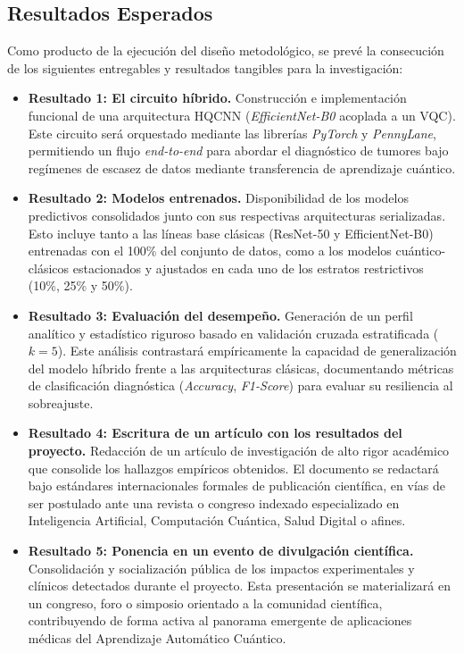 \documentclass[12pt,letterpaper]{article}
\begin{document}
    \subsection{Resultados Esperados}
    \vspace{-0.5cm}

    Como producto de la ejecución del diseño metodológico, se prevé la consecución de los siguientes entregables y resultados tangibles para la investigación:

    \begin{itemize}
        \item \textbf{Resultado 1: El circuito híbrido.} Construcción e implementación funcional de una arquitectura HQCNN (\textit{EfficientNet-B0} acoplada a un VQC). Este circuito será orquestado mediante las librerías \textit{PyTorch} y \textit{PennyLane}, permitiendo un flujo \textit{end-to-end} para abordar el diagnóstico de tumores bajo regímenes de escasez de datos mediante transferencia de aprendizaje cuántico.
        
        \item \textbf{Resultado 2: Modelos entrenados.} Disponibilidad de los modelos predictivos consolidados junto con sus respectivas arquitecturas serializadas. Esto incluye tanto a las líneas base clásicas (ResNet-50 y EfficientNet-B0) entrenadas con el 100\% del conjunto de datos, como a los modelos cuántico-clásicos estacionados y ajustados en cada uno de los estratos restrictivos (10\%, 25\% y 50\%).
        
        \item \textbf{Resultado 3: Evaluación del desempeño.} Generación de un perfil analítico y estadístico riguroso basado en validación cruzada estratificada ($k=5$). Este análisis contrastará empíricamente la capacidad de generalización del modelo híbrido frente a las arquitecturas clásicas, documentando métricas de clasificación diagnóstica (\textit{Accuracy}, \textit{F1-Score}) para evaluar su resiliencia al sobreajuste.
        
        \item \textbf{Resultado 4: Escritura de un artículo con los resultados del proyecto.} Redacción de un artículo de investigación de alto rigor académico que consolide los hallazgos empíricos obtenidos. El documento se redactará bajo estándares internacionales formales de publicación científica, en vías de ser postulado ante una revista o congreso indexado especializado en Inteligencia Artificial, Computación Cuántica, Salud Digital o afines.
        
        \item \textbf{Resultado 5: Ponencia en un evento de divulgación científica.} Consolidación y socialización pública de los impactos experimentales y clínicos detectados durante el proyecto. Esta presentación se materializará en un congreso, foro o simposio orientado a la comunidad científica, contribuyendo de forma activa al panorama emergente de aplicaciones médicas del Aprendizaje Automático Cuántico.
    \end{itemize}
\end{document}

